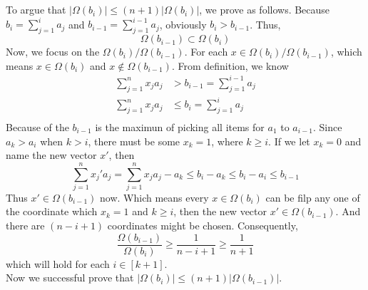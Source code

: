 \documentclass{article}
\begin{document}
	\section{}
	To argue that $|\Omega(b_i)| \leq (n+1)|\Omega(b_i)|$, we prove as follows.
	Because $b_i=\sum_{j=1}^{i}a_j$ and $b_{i-1}=\sum_{j=1}^{i-1}a_j$, obviously $b_i>b_{i-1}$. Thus,
	$$
	\Omega(b_{i-1}) \subset \Omega(b_i)
	$$
	Now, we focus on the $\Omega(b_i)/\Omega(b_{i-1})$.
	For each $x \in \Omega(b_i)/\Omega(b_{i-1})$, which means $x \in \Omega(b_i)$ and $x \notin \Omega(b_{i-1})$. From definition, we know
	$$
	\begin{aligned}
	\sum_{j=1}^{n}x_ja_j &> b_{i-1}=\sum_{j=1}^{i-1}a_j\\
	\sum_{j=1}^{n}x_ja_j &\leq b_{i}=\sum_{j=1}^{i}a_j\\
	\end{aligned}
	$$
	Because of the $b_{i-1}$ is the maximun of picking all items for $a_1$ to $a_{i-1}$.
	Since $a_k>a_i$ when $k>i$, there must be some $x_k=1$, where $k \geq i$. If we let $x_k=0$ and name the new vector $x'$, then
	$$
	\sum_{j=1}^{n}x_j'a_j=\sum_{j=1}^{n}x_ja_j-a_k \leq b_i-a_k \leq b_i-a_i \leq b_{i-1}
	$$
	Thus $x' \in \Omega(b_{i-1})$ now. Which means every $x \in \Omega(b_{i})$ can be filp any one of the coordinate which $x_k=1$ and $k \geq i$, then the new vector $x' \in \Omega(b_{i-1})$. And there are $(n-i+1)$ coordinates might be chosen.
	Consequently,
	$$
	\frac{\Omega(b_{i-1})}{\Omega(b_{i})} \geq \frac{1}{n-i+1} \geq \frac{1}{n+1}
	$$
	which will hold for each $i \in [k+1]$.\\
	Now we successful prove that $|\Omega(b_{i})| \leq (n+1)|\Omega(b_{i-1})|$.
\end{document}
